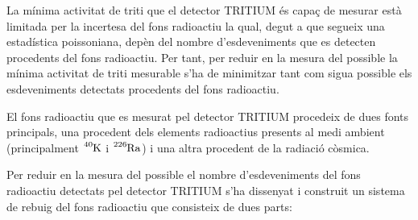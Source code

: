 La mínima activitat de triti que el detector TRITIUM és capaç de mesurar està limitada per la incertesa del fons radioactiu la qual, degut a que segueix una estadística poissoniana, depèn del nombre d'esdeveniments que es detecten procedents del fons radioactiu. Per tant, per reduir en la mesura del possible la mínima activitat de triti mesurable s'ha de minimitzar tant com sigua possible els esdeveniments detectats procedents del fons radioactiu. 

El fons radioactiu que es mesurat pel detector TRITIUM procedeix de dues fonts principals, una procedent dels elements radioactius presents al medi ambient (principalment $\ce{^{40}K}$ i $\ce{^{226}Ra}$) i una altra procedent de la radiació còsmica.

Per reduir en la mesura del possible el nombre d'esdeveniments del fons radioactiu detectats pel detector TRITIUM s'ha dissenyat i construit un sistema de rebuig del fons radioactiu que consisteix de dues parts:

